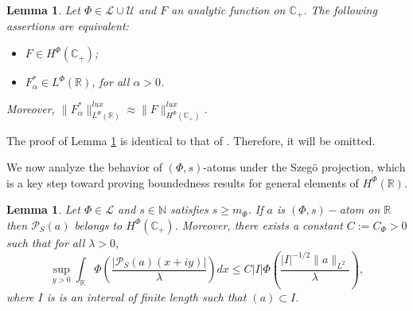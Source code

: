 \documentclass[a4paper,12pt,intlimits,oneside]{amsart}
\newtheorem{lemme}[theorem]{Lemma}
\theoremstyle{definition}
\numberwithin{equation}{section}
\theoremstyle{definition}
\begin{document}
\begin{lemme}\label{pro:main6aapaqmaqq4k}
Let  $\Phi \in \mathscr{L} \cup \mathscr{U}$ and   $F$  an analytic function on $\mathbb{C}_{+}$.  The following assertions are equivalent:
\begin{itemize}
  \item[(i)] $F \in H^{\Phi}(\mathbb{C}_{+})$;
  \item[(ii)]  $F_{\alpha}^{*} \in L^{\Phi}(\mathbb{R})$,  for all  $\alpha>0$.
 \end{itemize}
 Moreover, $\|F_{\alpha}^{*}\|_{L^{\Phi}(\mathbb{R})}^{lux} \approx \|F\|_{H^{\Phi}(\mathbb{C}_{+})}^{lux}$.
 \end{lemme}
 
 
The proof of Lemma \ref{pro:main6aapaqmaqq4k} is identical to that of \cite[Lemma 15]{djefeuto1}. Therefore, it will be omitted. 
 


\medskip

\noindent
We now analyze the behavior of $(\Phi,s)$-atoms under the Szeg\"o projection, which is a key step toward proving boundedness results for general elements of $H^{\Phi}(\mathbb{R})$.

\begin{lemme}\label{pro:main2aaqop}
Let  $\Phi\in   \mathscr{L}$ and $s \in \mathbb{N}$ satisfies $s \geq m_{\Phi}$. If $a$ is   $(\Phi,s)-$atom on $\mathbb{R}$ then $\mathcal{P}_{S}(a)$ belongs to  $H^{\Phi}(\mathbb{C}_{+})$. Moreover, there exists a constant $C:=C_{\Phi}>0$ such that for all $\lambda>0$,
\begin{equation}\label{eq:deaqaqa2}
\sup_{y>0}\int_{\mathbb{R}}\Phi\left( \frac{|\mathcal{P}_{S}(a)(x+iy)|}{\lambda}\right)dx \leq C |I|\Phi\left( \frac{|I|^{-1/2}\| a\|_{L^{2}}}{\lambda}\right), 
\end{equation}
where $I$ is is an interval of finite length such that  $(a)\subset I$.
\end{lemme}
\end{document}
